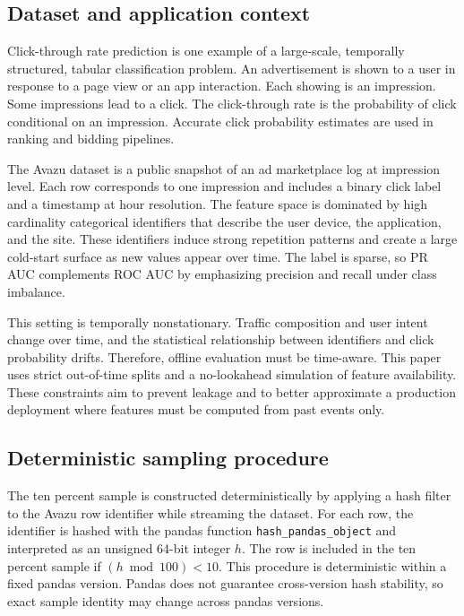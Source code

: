 \subsection*{Dataset and application context}
Click-through rate prediction is one example of a large-scale, temporally structured, tabular classification problem.
An advertisement is shown to a user in response to a page view or an app interaction.
Each showing is an impression.
Some impressions lead to a click.
The click-through rate is the probability of click conditional on an impression.
Accurate click probability estimates are used in ranking and bidding pipelines.

The Avazu dataset is a public snapshot of an ad marketplace log at impression level.
Each row corresponds to one impression and includes a binary click label and a timestamp at hour resolution.
The feature space is dominated by high cardinality categorical identifiers that describe the user device, the application, and the site.
These identifiers induce strong repetition patterns and create a large cold-start surface as new values appear over time.
The label is sparse, so PR AUC complements ROC AUC by emphasizing precision and recall under class imbalance.

This setting is temporally nonstationary.
Traffic composition and user intent change over time, and the statistical relationship between identifiers and click probability drifts.
Therefore, offline evaluation must be time-aware.
This paper uses strict out-of-time splits and a no-lookahead simulation of feature availability.
These constraints aim to prevent leakage and to better approximate a production deployment where features must be computed from past events only.

\subsection{Deterministic sampling procedure}
\label{sec:appendix_sampling}
The ten percent sample is constructed deterministically by applying a hash filter to the Avazu row identifier while streaming the dataset.
For each row, the identifier is hashed with the pandas function \texttt{hash\_pandas\_object} and interpreted as an unsigned 64-bit integer $h$.
The row is included in the ten percent sample if $(h \bmod 100) < 10$.
This procedure is deterministic within a fixed pandas version.
Pandas does not guarantee cross-version hash stability, so exact sample identity may change across pandas versions.

